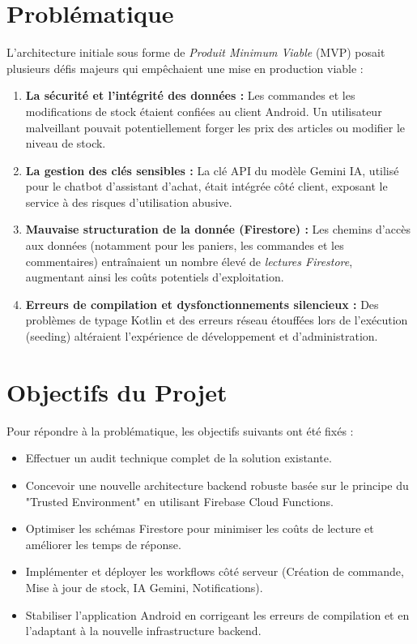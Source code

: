 \documentclass[12pt,a4paper]{report}
\begin{document}
\section{Problématique}
L'architecture initiale sous forme de \textit{Produit Minimum Viable} (MVP) posait plusieurs défis majeurs qui empêchaient une mise en production viable :
\begin{enumerate}
    \item \textbf{La sécurité et l'intégrité des données :} Les commandes et les modifications de stock étaient confiées au client Android. Un utilisateur malveillant pouvait potentiellement forger les prix des articles ou modifier le niveau de stock.
    \item \textbf{La gestion des clés sensibles :} La clé API du modèle Gemini IA, utilisé pour le chatbot d'assistant d'achat, était intégrée côté client, exposant le service à des risques d'utilisation abusive.
    \item \textbf{Mauvaise structuration de la donnée (Firestore) :} Les chemins d'accès aux données (notamment pour les paniers, les commandes et les commentaires) entraînaient un nombre élevé de \textit{lectures Firestore}, augmentant ainsi les coûts potentiels d'exploitation.
    \item \textbf{Erreurs de compilation et dysfonctionnements silencieux :} Des problèmes de typage Kotlin et des erreurs réseau étouffées lors de l'exécution (seeding) altéraient l'expérience de développement et d'administration.
\end{enumerate}

\section{Objectifs du Projet}
Pour répondre à la problématique, les objectifs suivants ont été fixés :
\begin{itemize}
    \item Effectuer un audit technique complet de la solution existante.
    \item Concevoir une nouvelle architecture backend robuste basée sur le principe du "Trusted Environment" en utilisant Firebase Cloud Functions.
    \item Optimiser les schémas Firestore pour minimiser les coûts de lecture et améliorer les temps de réponse.
    \item Implémenter et déployer les workflows côté serveur (Création de commande, Mise à jour de stock, IA Gemini, Notifications).
    \item Stabiliser l'application Android en corrigeant les erreurs de compilation et en l'adaptant à la nouvelle infrastructure backend.
\end{itemize}
\end{document}
